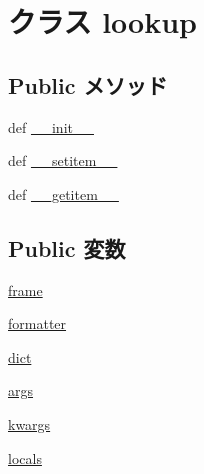 \hypertarget{classm5_1_1util_1_1code__formatter_1_1lookup}{
\section{クラス lookup}
\label{classm5_1_1util_1_1code__formatter_1_1lookup}
}
\subsection*{Public メソッド}
\begin{DoxyCompactItemize}
\item 
def \hyperlink{classm5_1_1util_1_1code__formatter_1_1lookup_ac775ee34451fdfa742b318538164070e}{\_\-\_\-init\_\-\_\-}
\item 
def \hyperlink{classm5_1_1util_1_1code__formatter_1_1lookup_a09195b01147e970ca71c48b57f653940}{\_\-\_\-setitem\_\-\_\-}
\item 
def \hyperlink{classm5_1_1util_1_1code__formatter_1_1lookup_a50d766f4276c3d8fe330ac8cd344a75f}{\_\-\_\-getitem\_\-\_\-}
\end{DoxyCompactItemize}
\subsection*{Public 変数}
\begin{DoxyCompactItemize}
\item 
\hyperlink{classm5_1_1util_1_1code__formatter_1_1lookup_a943f49763dd36e31fc7ea8604fcad789}{frame}
\item 
\hyperlink{classm5_1_1util_1_1code__formatter_1_1lookup_a48e3069f2fdad0ce8dfa0591cc95d6d3}{formatter}
\item 
\hyperlink{classm5_1_1util_1_1code__formatter_1_1lookup_aa61179392758805a1dfe6aa85c5c7919}{dict}
\item 
\hyperlink{classm5_1_1util_1_1code__formatter_1_1lookup_a8187411843a6284ffb964ef3fb9fcab3}{args}
\item 
\hyperlink{classm5_1_1util_1_1code__formatter_1_1lookup_aca174a4ca5cbfb3d1b2873c5e38f50aa}{kwargs}
\item 
\hyperlink{classm5_1_1util_1_1code__formatter_1_1lookup_a6048b6762294d5f06201009395e1af36}{locals}
\end{DoxyCompactItemize}


